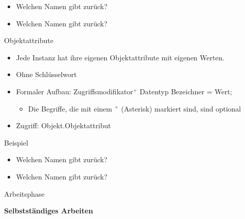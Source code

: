 \documentclass{../tuda-beamer}
\begin{document}
  \begin{frame}[c]
    \begin{itemize}
      \item Welchen Namen gibt  zurück?
      \item Welchen Namen gibt  zurück?
    \end{itemize}

    
  \end{frame}

  \begin{frame}{Objektattribute}
    \begin{itemize}
      \item Jede Instanz hat ihre eigenen Objektattribute mit eigenen Werten.
      \item Ohne Schlüsselwort 
      \item Formaler Aufbau: Zugriffsmodifikator\(^+\) Datentyp Bezeichner =
      Wert;
      \begin{itemize}
        \item Die Begriffe, die mit einem \(^+\) (Asterisk) markiert sind, sind optional
      \end{itemize}
      \item Zugriff: Objekt.Objektattribut
    \end{itemize}
  \end{frame}

  \begin{frame}[c]{Beispiel}
    
  \end{frame}

  \begin{frame}[c]
    \begin{itemize}
      \item Welchen Namen gibt  zurück?
      \item Welchen Namen gibt  zurück?
    \end{itemize}

    
  \end{frame}

  \begin{frame}[c]{Arbeitsphase}
    \begin{center}
      \textbf{\LARGE Selbstständiges Arbeiten}
    \end{center}
  \end{frame}
\end{document}
